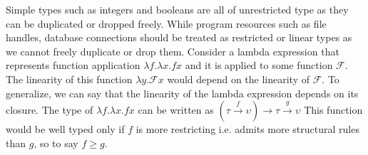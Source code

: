 Simple types such as integers and booleans are all of unrestricted type as
they can be duplicated or dropped freely. While program resources such as file handles, database connections
should be treated as restricted or linear types as we cannot freely duplicate
or drop them. Consider a lambda expression that represents function application $\lambda f. \lambda x. f x$ and it is applied to
some function $\mathcal{F}$. The linearity of this function $\lambda y. \mathcal{F} x$
would depend on the linearity of $\mathcal{F}$. To generalize, we can say that the linearity of the lambda expression depends
on its closure. The type of $\lambda f. \lambda x. f x$ can be written as $(\tau \overset{f}{\rightarrow} \upsilon) \rightarrow \tau \overset{g}{\rightarrow}\upsilon$
This function would be well typed only if $f$ is more restricting i.e. admits more structural rules than $g$, so to say $f \geq g$.

